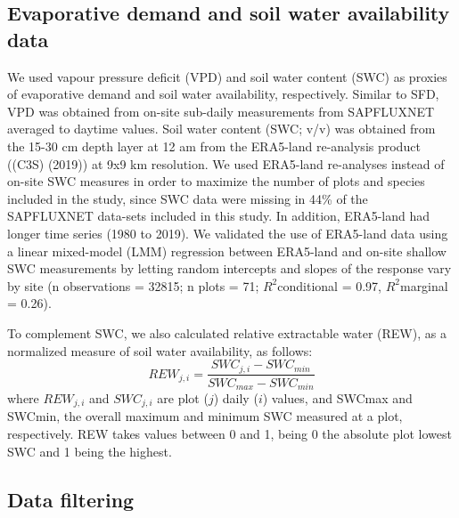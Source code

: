 \documentclass[11pt,twoside]{reedthesis}
\begin{document}
\subsection{Evaporative demand and soil water availability
data}\label{evaporative-demand-and-soil-water-availability-data}

We used vapour pressure deficit (VPD) and soil water content (SWC) as
proxies of evaporative demand and soil water availability, respectively.
Similar to SFD, VPD was obtained from on-site sub-daily measurements
from SAPFLUXNET averaged to daytime values. Soil water content (SWC;
v/v) was obtained from the 15-30 cm depth layer at 12 am from the
ERA5-land re-analysis product ((C3S) (2019)) at 9x9 km resolution. We
used ERA5-land re-analyses instead of on-site SWC measures in order to
maximize the number of plots and species included in the study, since
SWC data were missing in 44\% of the SAPFLUXNET data-sets included in
this study. In addition, ERA5-land had longer time series (1980 to
2019). We validated the use of ERA5-land data using a linear mixed-model
(LMM) regression between ERA5-land and on-site shallow SWC measurements
by letting random intercepts and slopes of the response vary by site (n
observations = 32815; n plots = 71; \(R^2\)conditional = 0.97,
\(R^2\)marginal = 0.26).\par

To complement SWC, we also calculated relative extractable water (REW),
as a normalized measure of soil water availability, as follows:
\begin{equation}
REW_{j,i} = \frac{SWC_{j,i} - SWC_{min}}{SWC_{max} - SWC_{min}}
\end{equation}
where \(REW_{j,i}\) and \(SWC_{j,i}\) are plot (\(j\)) daily (\(i\))
values, and SWCmax and SWCmin, the overall maximum and minimum SWC
measured at a plot, respectively. REW takes values between 0 and 1,
being 0 the absolute plot lowest SWC and 1 being the highest.\par

\subsection{Data filtering}\label{data-filtering}
\end{document}
